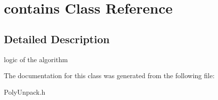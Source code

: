 \hypertarget{classcontains}{
\section{contains Class Reference}
\label{classcontains}
}


\subsection{Detailed Description}
logic of the algorithm 

The documentation for this class was generated from the following file:\begin{DoxyCompactItemize}
\item 
PolyUnpack.h\end{DoxyCompactItemize}
